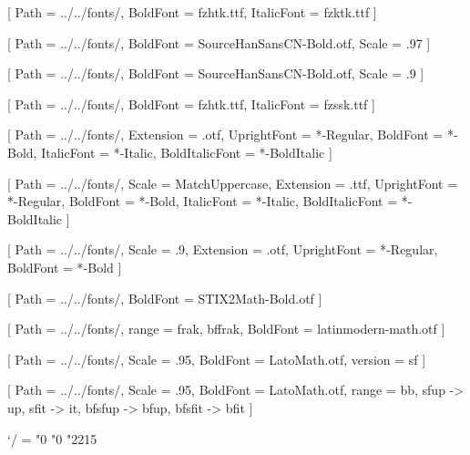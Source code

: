 \usepackage{geometry}
\geometry{
    paperwidth = 155mm,
    paperheight = 235mm,
    outer = 20mm,
    inner = 20mm,
    top = 25mm,
    bottom = 20mm
}

\usepackage[PunctStyle=kaiming]{xeCJK}
\usepackage{amsmath}
\usepackage{unicode-math}

[
    Path = ../../fonts/,
    BoldFont = fzhtk.ttf,
    ItalicFont = fzktk.ttf
]

[
    Path = ../../fonts/,
    BoldFont = SourceHanSansCN-Bold.otf,
    Scale = .97
]

[
    Path = ../../fonts/,
    BoldFont = SourceHanSansCN-Bold.otf,
    Scale = .9
]

[
    Path = ../../fonts/,
    BoldFont = fzhtk.ttf,
    ItalicFont = fzssk.ttf
]

\setmainfont{STIX2Text}[
    Path = ../../fonts/,
    Extension = .otf,
    UprightFont = *-Regular,
    BoldFont = *-Bold,
    ItalicFont = *-Italic,
    BoldItalicFont = *-BoldItalic
]

\setsansfont{Lato}[
    Path = ../../fonts/,
    Scale = MatchUppercase,
    Extension = .ttf,
    UprightFont = *-Regular,
    BoldFont = *-Bold,
    ItalicFont = *-Italic,
    BoldItalicFont = *-BoldItalic
]

\setmonofont{FiraMono}[
    Path = ../../fonts/,
    Scale = .9,
    Extension = .otf,
    UprightFont = *-Regular,
    BoldFont = *-Bold
]

[
    Path = ../../fonts/,
    BoldFont = STIX2Math-Bold.otf
]

[
    Path = ../../fonts/,
    range = {frak, bffrak},
    BoldFont = latinmodern-math.otf
]

[
    Path = ../../fonts/,
    Scale = .95,
    BoldFont = LatoMath.otf,
    version = sf
]

[
    Path = ../../fonts/,
    Scale = .95,
    BoldFont = LatoMath.otf,
    range = {bb, sfup -> up, sfit -> it, bfsfup -> bfup, bfsfit -> bfit}
]

\Umathcode`/  =  "0 "0 "2215    %

\usepackage{fancyhdr}
\fancyhf{}
\fancyhead[LE,RO]{\textbf{\textsf{\thepage}}}
\headsep=8mm
\headheight=6mm

